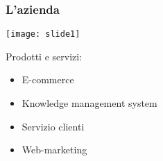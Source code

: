 \begin{frame}
\frametitle{L'azienda}
\begin{minipage}[c]{.45\textwidth}
\centering 
\texttt{[image: slide1]}
\end{minipage}
\begin{minipage}[c]{.45\textwidth}
Prodotti e servizi:
\begin{itemize}
\item E-commerce
\item Knowledge management system
\item Servizio clienti
\item Web-marketing
\end{itemize}
\end{minipage}
\end{frame}